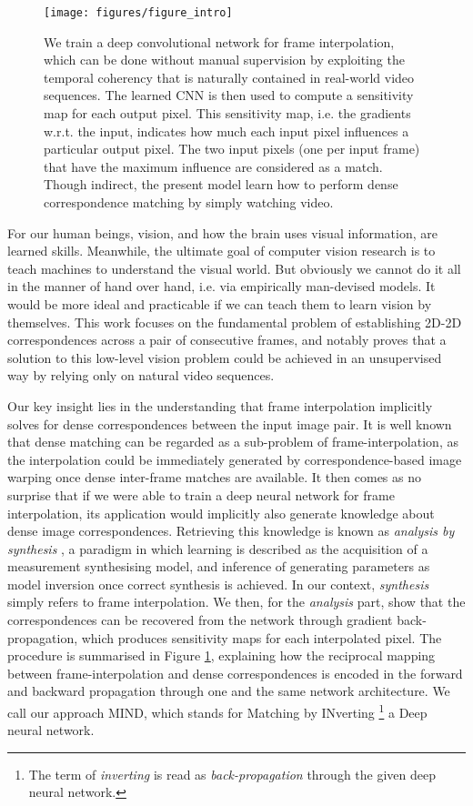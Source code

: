 \documentclass[runningheads]{llncs}
\begin{document}
\begin{figure}[t]
		\centering
		\texttt{[image: figures/figure\_intro]}
		\caption{We train a deep convolutional network for frame interpolation, which can be done without manual supervision by exploiting the temporal coherency that is naturally contained in real-world video sequences. The learned CNN is then used to compute a sensitivity map for each output pixel. This sensitivity map, i.e. the gradients w.r.t. the input, indicates how much each input pixel influences a particular output pixel. The two input pixels (one per input frame) that have the maximum influence are considered as a match. Though indirect, the present model learn how to perform dense correspondence matching by simply watching video.}
		\label{fig:introduction}
	\end{figure}
	
	

  
  For our human beings, vision, and how the brain uses visual information, are learned skills. Meanwhile, the ultimate goal of computer vision research is to teach machines to understand the visual world. But obviously we cannot do it all in the manner of hand over hand, i.e. via empirically man-devised models. It would be more ideal and practicable if we can teach them to learn vision by themselves. This work focuses on the fundamental problem of establishing 2D-2D correspondences across a pair of consecutive frames, and notably proves that a solution to this low-level vision problem could be achieved in an unsupervised way by relying only on natural video sequences. 
  
  Our key insight lies in the understanding that frame interpolation implicitly solves for dense correspondences between the input image pair. It is well known that dense matching can be regarded as a sub-problem of frame-interpolation, as the interpolation could be immediately generated by correspondence-based image warping once dense inter-frame matches are available. It then comes as no surprise that if we were able to train a deep neural network for frame interpolation, its application would implicitly also generate knowledge about dense image correspondences. Retrieving this knowledge is known as \textit{analysis by synthesis} \cite{yildirim15}, a paradigm in which learning is described as the acquisition of a measurement synthesising model, and inference of generating parameters as model inversion once correct synthesis is achieved. In our context, \textit{synthesis} simply refers to frame interpolation. We then, for the \textit{analysis} part, show that the correspondences can be recovered from the network through gradient back-propagation, which produces sensitivity maps for each interpolated pixel. The procedure is summarised in Figure \ref{fig:introduction}, explaining how the reciprocal mapping between frame-interpolation and dense correspondences is encoded in the forward and backward propagation through one and the same network architecture. We call our approach MIND, which stands for Matching by INverting \footnote{The term of \textit{inverting} is read as \textit{back-propagation} through the given deep neural network.} a Deep neural network.
    
\end{document}
